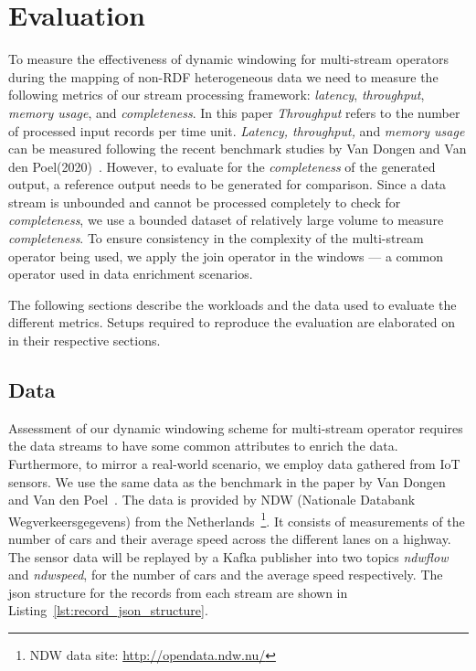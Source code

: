 \chapter{Evaluation}
\label{chap:Evaluation}

To measure the effectiveness of dynamic windowing for multi-stream operators during the 
mapping of non-RDF heterogeneous data we need to measure the following 
metrics of our stream processing framework: \emph{latency}, \emph{throughput},
\emph{memory usage}, and \emph{completeness}. In this paper \emph{Throughput} refers to the number of processed input records per time unit.
\emph{Latency, throughput,} and \emph{memory usage} can be measured following the recent benchmark studies by 
Van Dongen and Van den Poel(2020)~\cite{evalution_of_spe}.
However, to evaluate 
for the \emph{completeness}
of the generated output, a reference output needs 
to be generated for comparison. Since a data stream is unbounded and cannot be processed completely to check for \emph{completeness}, we use a bounded 
dataset of relatively large volume to measure \emph{completeness}.
To ensure consistency in the complexity of the multi-stream operator being used, 
we apply the join operator in the windows --- a common operator used in 
data enrichment scenarios. 

The following sections describe the workloads and the data used to evaluate the
different metrics. Setups required to reproduce the evaluation are elaborated on
in their respective sections. 


\section{Data}

Assessment of our dynamic windowing scheme for multi-stream operator requires 
the data streams to have some common attributes to enrich the data. Furthermore, to 
mirror a real-world scenario, we employ data gathered from IoT sensors. 
We use the same data 
as the benchmark in the paper by Van Dongen and Van den Poel~\cite{evalution_of_spe}. 
The data is provided by NDW (Nationale Databank Wegverkeersgegevens) from the 
Netherlands~\footnote{NDW data site: \href{http://opendata.ndw.nu/}{http://opendata.ndw.nu/} }.
It consists of measurements of the number of cars and their average speed across the different 
lanes on a highway. 
The sensor data will be replayed by a Kafka publisher into two topics 
\emph{ndwflow} and \emph{ndwspeed}, for the number of cars and the average speed respectively. The json 
structure for the records from each stream are shown in Listing~\ref{lst:record_json_structure}. 

